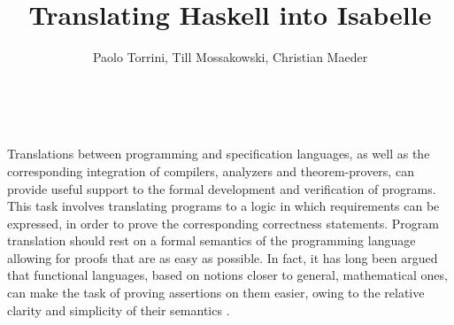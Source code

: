 \documentclass{llncs}
\begin{document}
\title{Translating Haskell into Isabelle}

\author{Paolo Torrini, Till Mossakowski, Christian Maeder} 

\date{}

\maketitle

\\

\sloppy

\noindent 
Translations between programming and specification languages, as well as the
corresponding integration of compilers, analyzers and theorem-provers, can
provide useful support to the formal development and verification of programs.
This task involves translating programs to a logic in which requirements can
be expressed, in order to prove the corresponding correctness statements.
Program translation should rest on a formal semantics of the programming
language allowing for proofs that are as easy as possible. In fact, it has
long been argued that functional languages, based on notions closer to
general, mathematical ones, can make the task of proving assertions on them
easier, owing to the relative clarity and simplicity of their semantics
\cite{Thompson92}.
\end{document}
